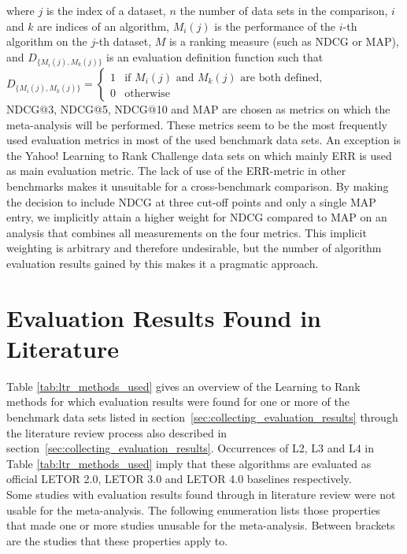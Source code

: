 where $j$ is the index of a dataset, $n$ the number of data sets in the comparison, $i$ and $k$ are indices of an algorithm, $M_i(j)$ is the performance of the $i$-th algorithm on the $j$-th dataset, $M$ is a ranking measure (such as \ac{NDCG} or \ac{MAP}), and $D_{\{M_i(j),M_k(j)\}}$ is an evaluation definition function such that\\

$D_{\{M_i(j),M_k(j)\}} = \begin{cases}
1 & \text{if } M_i(j) \text{ and } M_k(j) \text{ are both defined}, \\
0 & \text{otherwise}
\end{cases}$\\

\ac{NDCG}@3, \ac{NDCG}@5, \ac{NDCG}@10 and \ac{MAP} are chosen as metrics on which the meta-analysis will be performed. These metrics seem to be the most frequently used evaluation metrics in most of the used benchmark data sets. An exception is the Yahoo! Learning to Rank Challenge data sets on which mainly \ac{ERR} is used as main evaluation metric. The lack of use of the \ac{ERR}-metric in other benchmarks makes it unsuitable for a cross-benchmark comparison. By making the decision to include \ac{NDCG} at three cut-off points and only a single \ac{MAP} entry, we implicitly attain a higher weight for \ac{NDCG} compared to \ac{MAP} on an analysis that combines all measurements on the four metrics. This implicit weighting is arbitrary and therefore undesirable, but the number of algorithm evaluation results gained by this makes it a pragmatic approach.

\section{Evaluation Results Found in Literature}
Table \ref{tab:ltr_methods_used} gives an overview of the Learning to Rank methods for which evaluation results were found for one or more of the benchmark data sets listed in section~\ref{sec:collecting_evaluation_results} through the literature review process also described in section~\ref{sec:collecting_evaluation_results}. Occurrences of L2, L3 and L4 in Table \ref{tab:ltr_methods_used} imply that these algorithms are evaluated as official LETOR 2.0, LETOR 3.0 and LETOR 4.0 baselines respectively.\\

Some studies with evaluation results found through in literature review were not usable for the meta-analysis. The following enumeration lists those properties that made one or more studies unusable for the meta-analysis. Between brackets are the studies that these properties apply to.

